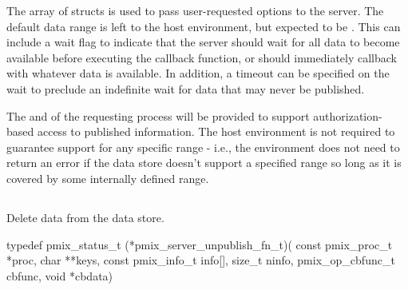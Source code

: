 The array of  structs is used to pass user-requested options to the server. The default data range is left to the host environment, but expected to be .
This can include a wait flag to indicate that the server should wait for all data to become available before executing the callback function, or should immediately callback with whatever data is available.
In addition, a timeout can be specified on the wait to preclude an indefinite wait for data that may never be published.

\advicermstart
The  and  of the requesting process will be provided to support authorization-based access to published information. The host environment is not required to guarantee support for any specific range - i.e., the environment does not need to return an error if the data store doesn't support a specified range so long as it is covered by some internally defined range.
\advicermend

\subsection{}

\summary

Delete data from the data store.

\format

\cspecificstart
\begin{codepar}
typedef pmix_status_t (*pmix_server_unpublish_fn_t)(
                             const pmix_proc_t *proc,
                             char **keys,
                             const pmix_info_t info[],
                             size_t ninfo,
                             pmix_op_cbfunc_t cbfunc,
                             void *cbdata)
\end{codepar}
\cspecificend

\begin{arglist}
\end{arglist}


